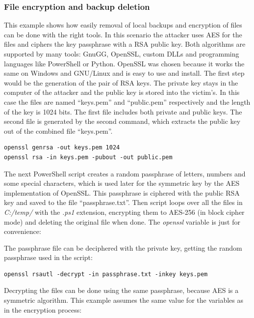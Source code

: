 
\subsubsection{File encryption and backup deletion}
This example shows how easily removal of local backups and encryption of files can be done with the right tools.
\linej
In this scenario the attacker uses AES for the files and ciphers the key passphrase with a RSA public key.
Both algorithms are supported by many tools: GnuGG, OpenSSL, custom DLLs and programming languages like PowerShell or Python.
OpenSSL was chosen because it works the same on Windows and GNU/Linux and is easy to use and install.
\linej
\linej
The first step would be the generation of the pair of RSA keys.
The private key stays in the computer of the attacker and the public key is stored into the victim's.
In this case the files are named ``keys.pem'' and ``public.pem'' respectively and the length of the key is 1024 bits.
The first file includes both private and public keys.
The second file is generated by the second command, which extracts the public key out of the combined file ``keys.pem''.
\begin{lstlisting}[style=PS,keywordstyle=\color{black}]
openssl genrsa -out keys.pem 1024
openssl rsa -in keys.pem -pubout -out public.pem
\end{lstlisting}
\linej
The next PowerShell script creates a random passphrase of letters, numbers and some special characters, which is used later for the symmetric key by the AES implementation of OpenSSL.
This passphrase is ciphered with the public RSA key and saved to the file ``passphrase.txt''.
Then script loops over all the files in \textit{C:/temp/} with the \textit{.ps1} extension, encrypting them to AES-256 (in block cipher mode) and deleting the original file when done.
The \textit{openssl} variable is just for convenience:

\linej
The passphrase file can be deciphered with the private key, getting the random passphrase used in the script:
\begin{lstlisting}[style=PS,keywordstyle=\color{black}]
openssl rsautl -decrypt -in passphrase.txt -inkey keys.pem
\end{lstlisting}
\linej
Decrypting the files can be done using the same passphrase, because AES is a symmetric algorithm.
This example assumes the same value for the variables as in the encryption process:

\linej

